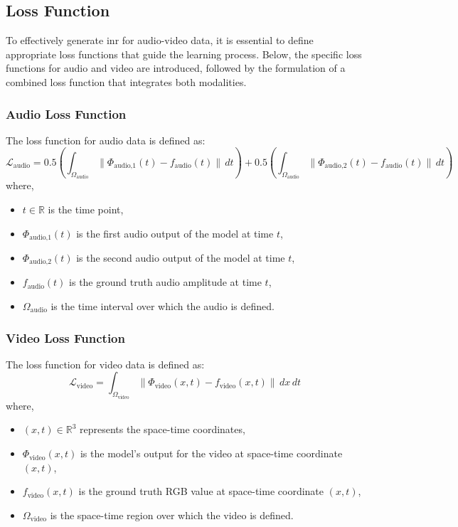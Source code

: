     \subsection{Loss Function}
    To effectively generate \gls{inr} for audio-video data, it is essential to define appropriate loss functions that guide the learning process. Below, the specific loss functions for audio and video are introduced, followed by the formulation of a combined loss function that integrates both modalities.

        \subsubsection{Audio Loss Function}
        The loss function for audio data is defined as:
        \begin{equation}
            \mathcal{L}_{\text{audio}} = 0.5 \left( \int_{\Omega_{\text{audio}}} \| \Phi_{\text{audio,1}}(t) - f_{\text{audio}}(t) \| \, dt \right) + 0.5 \left( \int_{\Omega_{\text{audio}}} \| \Phi_{\text{audio,2}}(t) - f_{\text{audio}}(t) \| \, dt \right)
        \end{equation}
        where,
        \begin{itemize}
            \item \( t \in \mathbb{R} \) is the time point,
            \item  \( \Phi_{\text{audio,1}}(t) \) is the first audio output of the model at time \( t \),
            \item \( \Phi_{\text{audio,2}}(t) \) is the second audio output of the model at time \( t \),
            \item \( f_{\text{audio}}(t) \) is the ground truth audio amplitude at time \( t \),
            \item \( \Omega_{\text{audio}} \) is the time interval over which the audio is defined.
        \end{itemize}
    
        \subsubsection{Video Loss Function}
            The loss function for video data is defined as:
        \begin{equation}
            \mathcal{L}_{\text{video}} = \int_{\Omega_{\text{video}}} \| \Phi_{\text{video}}(x, t) - f_{\text{video}}(x, t) \| \, dx \, dt
        \end{equation}
        where,
        \begin{itemize}
        \item \( (x, t) \in \mathbb{R}^3 \) represents the space-time coordinates,
        \item \( \Phi_{\text{video}}(x, t) \) is the model's output for the video at space-time coordinate \( (x, t) \),
        \item \( f_{\text{video}}(x, t) \) is the ground truth RGB value at space-time coordinate \( (x, t) \),
        \item \( \Omega_{\text{video}} \) is the space-time region over which the video is defined.
        \end{itemize}
    
